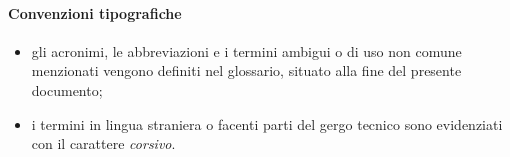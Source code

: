 \paragraph{Convenzioni tipografiche}
\begin{itemize}
	\item gli acronimi, le abbreviazioni e i termini ambigui o di uso non comune menzionati vengono definiti nel glossario, situato alla fine del presente documento;
	\item i termini in lingua straniera o facenti parti del gergo tecnico sono evidenziati con il carattere \textit{corsivo}.
\end{itemize}

\endgroup
\vfill

